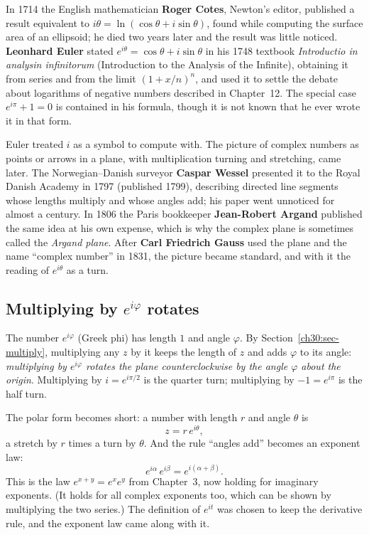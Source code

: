 \begin{historybox}
In 1714 the English mathematician \textbf{Roger Cotes}, Newton's editor, published a result equivalent to $i\theta = \ln(\cos\theta + i\sin\theta)$, found while computing the surface area of an ellipsoid; he died two years later and the result was little noticed. \textbf{Leonhard Euler} stated $e^{i\theta} = \cos\theta + i\sin\theta$ in his 1748 textbook \emph{Introductio in analysin infinitorum} (Introduction to the Analysis of the Infinite), obtaining it from series and from the limit $(1 + x/n)^n$, and used it to settle the debate about logarithms of negative numbers described in Chapter~12. The special case $e^{i\pi} + 1 = 0$ is contained in his formula, though it is not known that he ever wrote it in that form.

Euler treated $i$ as a symbol to compute with. The picture of complex numbers as points or arrows in a plane, with multiplication turning and stretching, came later. The Norwegian--Danish surveyor \textbf{Caspar Wessel} presented it to the Royal Danish Academy in 1797 (published 1799), describing directed line segments whose lengths multiply and whose angles add; his paper went unnoticed for almost a century. In 1806 the Paris bookkeeper \textbf{Jean-Robert Argand} published the same idea at his own expense, which is why the complex plane is sometimes called the \emph{Argand plane}. After \textbf{Carl Friedrich Gauss} used the plane and the name ``complex number'' in 1831, the picture became standard, and with it the reading of $e^{i\theta}$ as a turn.
\end{historybox}

\subsection{\texorpdfstring{Multiplying by $e^{i\varphi}$ rotates}{Multiplying by e to the i phi rotates}}

The number $e^{i\varphi}$ (Greek phi) has length $1$ and angle $\varphi$. By Section~\ref{ch30:sec-multiply}, multiplying any $z$ by it keeps the length of $z$ and adds $\varphi$ to its angle: \emph{multiplying by $e^{i\varphi}$ rotates the plane counterclockwise by the angle $\varphi$ about the origin}. Multiplying by $i = e^{i\pi/2}$ is the quarter turn; multiplying by $-1 = e^{i\pi}$ is the half turn.

The polar form becomes short: a number with length $r$ and angle $\theta$ is
\[
  z = r\,e^{i\theta},
\]
a stretch by $r$ times a turn by $\theta$. And the rule ``angles add'' becomes an exponent law:
\[
  e^{i\alpha}\,e^{i\beta} = e^{i(\alpha+\beta)}.
\]
This is the law $e^{x+y} = e^x e^y$ from Chapter~3, now holding for imaginary exponents. (It holds for all complex exponents too, which can be shown by multiplying the two series.) The definition of $e^{it}$ was chosen to keep the derivative rule, and the exponent law came along with it.

